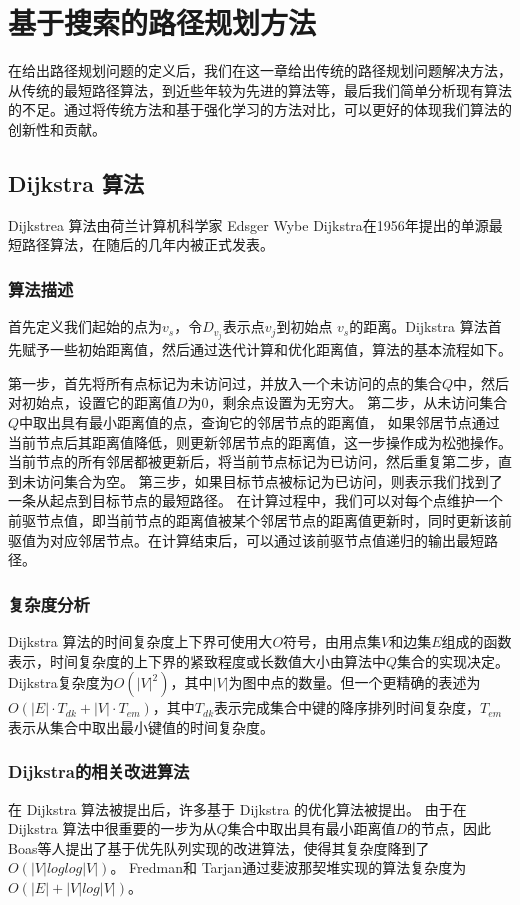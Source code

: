 \documentclass{standalone}
\begin{document}
\chapter{基于搜索的路径规划方法}
在给出路径规划问题的定义后，我们在这一章给出传统的路径规划问题解决方法，从传统的最短路径算法，到近些年较为先进的算法等，最后我们简单分析现有算法的不足。通过将传统方法和基于强化学习的方法对比，可以更好的体现我们算法的创新性和贡献。
\section{Dijkstra 算法}
Dijkstrea 算法由荷兰计算机科学家 Edsger Wybe Dijkstra在1956年提出的单源最短路径算法，在随后的几年内被正式发表。
\subsection{算法描述}
首先定义我们起始的点为$v_s$，令$D_{v_j}$表示点$v_j$到初始点 $v_s$的距离。Dijkstra 算法首先赋予一些初始距离值，然后通过迭代计算和优化距离值，算法的基本流程如下。\par
第一步，首先将所有点标记为未访问过，并放入一个未访问的点的集合$Q$中，然后对初始点，设置它的距离值$D$为0，剩余点设置为无穷大。
第二步，从未访问集合$Q$中取出具有最小距离值的点，查询它的邻居节点的距离值，
如果邻居节点通过当前节点后其距离值降低，则更新邻居节点的距离值，这一步操作成为松弛操作。当前节点的所有邻居都被更新后，将当前节点标记为已访问，然后重复第二步，直到未访问集合为空。
第三步，如果目标节点被标记为已访问，则表示我们找到了一条从起点到目标节点的最短路径。
在计算过程中，我们可以对每个点维护一个前驱节点值，即当前节点的距离值被某个邻居节点的距离值更新时，同时更新该前驱值为对应邻居节点。在计算结束后，可以通过该前驱节点值递归的输出最短路径。
\subsection{复杂度分析}
Dijkstra 算法的时间复杂度上下界可使用大$O$符号，由用点集$V$和边集$E$组成的函数表示，时间复杂度的上下界的紧致程度或长数值大小由算法中$Q$集合的实现决定。Dijkstra复杂度为$O(|V|^2)$，其中$|V|$为图中点的数量。但一个更精确的表述为 $O(|E|\cdot T_{dk} + |V|\cdot T_{em})$，其中$T_{dk}$表示完成集合中键的降序排列时间复杂度，$T_{em}$表示从集合中取出最小键值的时间复杂度。
\subsection{Dijkstra的相关改进算法}
在 Dijkstra 算法被提出后，许多基于 Dijkstra 的优化算法被提出。
由于在 Dijkstra 算法中很重要的一步为从$Q$集合中取出具有最小距离值$D$的节点，因此Boas等人提出了基于优先队列实现的改进算法，使得其复杂度降到了$O(|V|loglog|V|)$。
Fredman和 Tarjan通过斐波那契堆实现的算法复杂度为$O(|E| + |V|log|V|)$。
\end{document}
